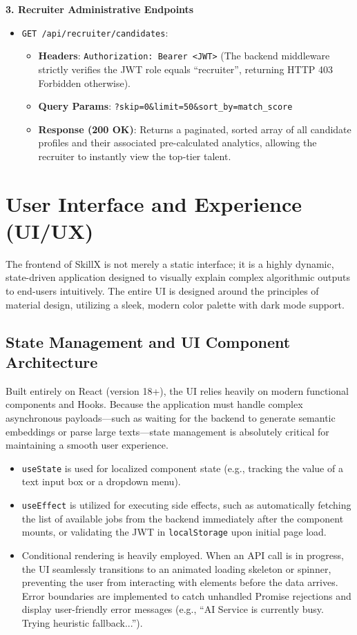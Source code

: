 \documentclass[12pt,a4paper]{report}
\begin{document}
\textbf{3. Recruiter Administrative Endpoints}
\begin{itemize}
    \item \texttt{GET /api/recruiter/candidates}:
      \begin{itemize}
          \item \textbf{Headers}: \texttt{Authorization: Bearer <JWT>} (The backend middleware strictly verifies the JWT role equals ``recruiter'', returning HTTP 403 Forbidden otherwise).
          \item \textbf{Query Params}: \texttt{?skip=0\&limit=50\&sort\_by=match\_score}
          \item \textbf{Response (200 OK)}: Returns a paginated, sorted array of all candidate profiles and their associated pre-calculated analytics, allowing the recruiter to instantly view the top-tier talent.
      \end{itemize}
\end{itemize}

\chapter{User Interface and Experience (UI/UX)}

The frontend of SkillX is not merely a static interface; it is a highly dynamic, state-driven application designed to visually explain complex algorithmic outputs to end-users intuitively. The entire UI is designed around the principles of material design, utilizing a sleek, modern color palette with dark mode support.

\section{State Management and UI Component Architecture}

Built entirely on React (version 18+), the UI relies heavily on modern functional components and Hooks. Because the application must handle complex asynchronous payloads---such as waiting for the backend to generate semantic embeddings or parse large texts---state management is absolutely critical for maintaining a smooth user experience.

\begin{itemize}
    \item \texttt{useState} is used for localized component state (e.g., tracking the value of a text input box or a dropdown menu).
    \item \texttt{useEffect} is utilized for executing side effects, such as automatically fetching the list of available jobs from the backend immediately after the component mounts, or validating the JWT in \texttt{localStorage} upon initial page load.
    \item Conditional rendering is heavily employed. When an API call is in progress, the UI seamlessly transitions to an animated loading skeleton or spinner, preventing the user from interacting with elements before the data arrives. Error boundaries are implemented to catch unhandled Promise rejections and display user-friendly error messages (e.g., ``AI Service is currently busy. Trying heuristic fallback...'').
\end{itemize}
\end{document}
